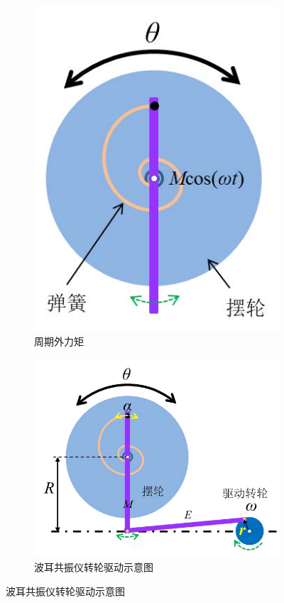 \documentclass[12pt,a4paper]{amsart}
\begin{document}
\begin{figure}
\begin{subfigure}[b]{0.2475\linewidth}
        \includegraphics[width=\linewidth]{img/2.jpg}
        \caption{周期外力矩}
        \label{fig:2}
    \end{subfigure}
    \hfill
    \begin{subfigure}[b]{0.405\linewidth}
        \centering
        \includegraphics[width=\linewidth]{img/3.jpg}
        \caption{波耳共振仪转轮驱动示意图}
        \label{fig:3}
    \end{subfigure}
\end{figure}
\end{document}
